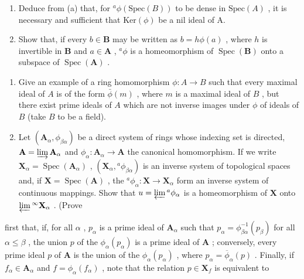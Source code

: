 \begin{enumerate}
\def\labelenumi{(\alph{enumi})}
\setcounter{enumi}{1}
\item
  Deduce from (a) that, for \(^{a}\phi(\text{Spec}(B))\) to be dense in \(\text{Spec}(A)\) , it is necessary and sufficient that \(\text{Ker}(\phi)\) be a nil ideal of A.
\item
  Show that, if every \(b \in \mathbf{B}\) may be written as \(b = h\phi(a)\) , where \(h\) is invertible in \(\mathbf{B}\) and \(a \in \mathbf{A}\) , \(^a\phi\) is a homeomorphism of \(\operatorname{Spec}(\mathbf{B})\) onto a subspace of \(\operatorname{Spec}(\mathbf{A})\) .
\end{enumerate}

\begin{enumerate}
\def\labelenumi{\arabic{enumi}.}
\setcounter{enumi}{19}
\item
  Give an example of a ring homomorphism \(\phi: A \to B\) such that every maximal ideal of \(A\) is of the form \(\bar{\phi}(m)\) , where \(m\) is a maximal ideal of \(B\) , but there exist prime ideals of \(A\) which are not inverse images under \(\phi\) of ideals of \(B\) (take \(B\) to be a field).
\item
  Let \((\mathbf{A}_{\alpha}, \phi_{\beta \alpha})\) be a direct system of rings whose indexing set is directed, \(\mathbf{A} = \varinjlim \mathbf{A}_{\alpha}\) and \(\phi_{\alpha}: \mathbf{A}_{\alpha} \to \mathbf{A}\) the canonical homomorphism. If we write \(\mathbf{X}_{\alpha} = \operatorname{Spec}(\mathbf{A}_{\alpha})\) , \((\mathbf{X}_{\alpha}, {}^{a}\phi_{\beta \alpha})\) is an inverse system of topological spaces and, if \(\mathbf{X} = \operatorname{Spec}(\mathbf{A})\) , the \({}^{a}\phi_{\alpha}: \mathbf{X} \to \mathbf{X}_{\alpha}\) form an inverse system of continuous mappings. Show that \(u = \varprojlim {}^{a}\phi_{\alpha}\) is a homeomorphism of \(\mathbf{X}\) onto \(\varprojlim {}^{\infty}\mathbf{X}_{\alpha}\) . (Prove
\end{enumerate}

first that, if, for all \(\alpha\) , \(p_{\alpha}\) is a prime ideal of \(\mathbf{A}_{\alpha}\) such that \(p_{\alpha} = \phi_{\beta \alpha}^{-1}(p_{\beta})\) for all \(\alpha \leqslant \beta\) , the union \(p\) of the \(\phi_{\alpha}(p_{\alpha})\) is a prime ideal of \(\mathbf{A}\) ; conversely, every prime ideal \(p\) of \(\mathbf{A}\) is the union of the \(\phi_{\alpha}(p_{\alpha})\) , where \(p_{\alpha} = \overline{\phi}_{\alpha}(p)\) . Finally, if \(f_{\alpha} \in \mathbf{A}_{\alpha}\) and \(f = \phi_{\alpha}(f_{\alpha})\) , note that the relation \(p \in \mathbf{X}_f\) is equivalent to

